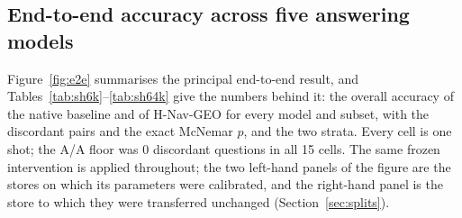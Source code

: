 \documentclass[journal=jcisd8,manuscript=article]{achemso}
\begin{document}

\subsection{End-to-end accuracy across five answering models}
\label{sec:e2e}

Figure~\ref{fig:e2e} summarises the principal end-to-end result, and Tables~\ref{tab:sh6k}--\ref{tab:sh64k} give the numbers behind it: the overall accuracy of the native baseline and of H-Nav-GEO for every model and subset, with the discordant pairs and the exact McNemar $p$, and the two strata. Every cell is one shot; the A/A floor was 0 discordant questions in all 15 cells. The same frozen intervention is applied throughout; the two left-hand panels of the figure are the stores on which its parameters were calibrated, and the right-hand panel is the store to which they were transferred unchanged (Section~\ref{sec:splits}).

\begin{table}[H]\centering\small
\caption{sh\_6k (calibration split; $n=100$).}\label{tab:sh6k}
\end{table}
\end{document}
